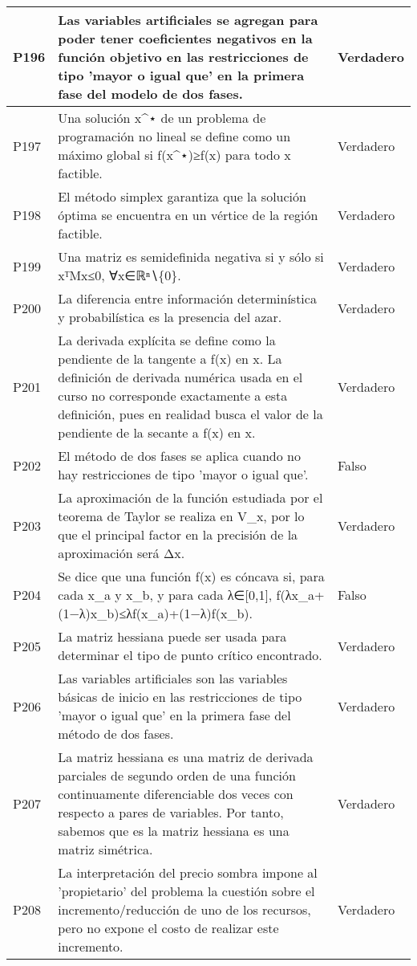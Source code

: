 \documentclass{article}
\begin{document}
\begin{longtable}{|>{\centering\arraybackslash}p{1.5cm}|>{\raggedright\arraybackslash}p{14cm}|>{\centering\arraybackslash}p{2cm}|}
\hline
P196 & Las variables artificiales se agregan para poder tener coeficientes negativos en la función objetivo en las restricciones de tipo 'mayor o igual que' en la primera fase del modelo de dos fases. & Verdadero \\
\hline
P197 & Una solución x\^{}⋆ de un problema de programación no lineal se define como un máximo global si f(x\^{}⋆)≥f(x) para todo x factible. & Verdadero \\
\hline
P198 & El método simplex garantiza que la solución óptima se encuentra en un vértice de la región factible. & Verdadero \\
\hline
P199 & Una matriz es semidefinida negativa si y sólo si xᵀMx≤0, ∀x∈ℝⁿ∖\{0\}. & Verdadero \\
\hline
P200 & La diferencia entre información determinística y probabilística es la presencia del azar. & Verdadero \\
\hline
P201 & La derivada explícita se define como la pendiente de la tangente a f(x) en x. La definición de derivada numérica usada en el curso no corresponde exactamente a esta definición, pues en realidad busca el valor de la pendiente de la secante a f(x) en x. & Verdadero \\
\hline
P202 & El método de dos fases se aplica cuando no hay restricciones de tipo 'mayor o igual que'. & Falso \\
\hline
P203 & La aproximación de la función estudiada por el teorema de Taylor se realiza en V\_x, por lo que el principal factor en la precisión de la aproximación será Δx. & Verdadero \\
\hline
P204 & Se dice que una función f(x) es cóncava si, para cada x\_a y x\_b, y para cada λ∈[0,1], f(λx\_a+(1−λ)x\_b)≤λf(x\_a)+(1−λ)f(x\_b). & Falso \\
\hline
P205 & La matriz hessiana puede ser usada para determinar el tipo de punto crítico encontrado. & Verdadero \\
\hline
P206 & Las variables artificiales son las variables básicas de inicio en las restricciones de tipo 'mayor o igual que' en la primera fase del método de dos fases. & Verdadero \\
\hline
P207 & La matriz hessiana es una matriz de derivada parciales de segundo orden de una función continuamente diferenciable dos veces con respecto a pares de variables. Por tanto, sabemos que es la matriz hessiana es una matriz simétrica. & Verdadero \\
\hline
P208 & La interpretación del precio sombra impone al 'propietario' del problema la cuestión sobre el incremento/reducción de uno de los recursos, pero no expone el costo de realizar este incremento. & Verdadero \\

\end{longtable}
\end{document}
